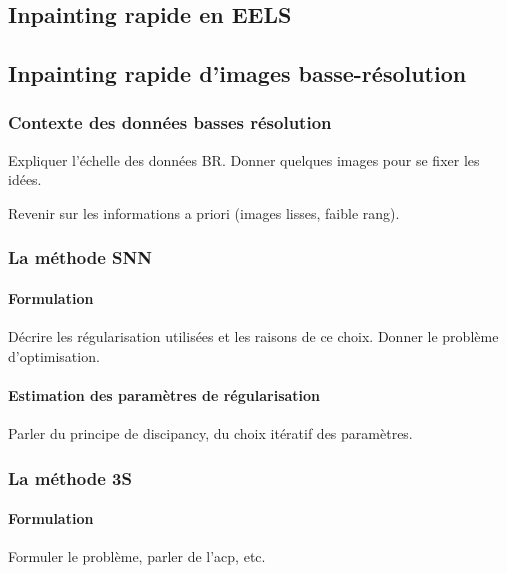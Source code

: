 \documentclass[a4paper, twoside, table, justified,
               nofonts, nobib, nohyper, 10pt, french]{tufte-book}
\begin{document}





%
%

\begin{fullwidth}
	\part{Inpainting rapide en EELS}
\end{fullwidth}


\chapter{Inpainting rapide d'images basse-résolution}
\label{ch-chapter_3}
\dochaptoc
%
\section{Contexte des données basses résolution}
Expliquer l'échelle des données BR. Donner quelques images pour se fixer les idées.

Revenir sur les informations a priori (images lisses, faible rang).

%
\section{La méthode SNN}

\subsection{Formulation}
Décrire les régularisation utilisées et les raisons de ce choix. Donner le problème d'optimisation.

\subsection{Estimation des paramètres de régularisation}
Parler du principe de discipancy, du choix itératif des paramètres.

%
\section{La méthode 3S}

\subsection{Formulation}
Formuler le problème, parler de l'acp, etc.
\end{document}
